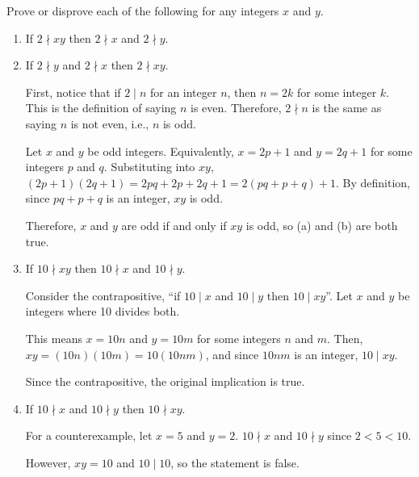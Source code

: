 \begin{recommended}
  Prove or disprove each of the following for any integers $x$ and $y$.
\end{recommended}
\begin{enumerate}
  \item If $2 \nmid xy$ then $2 \nmid x$ and $2 \nmid y$.
  \item If $2 \nmid y$ and $2 \nmid x$ then $2 \nmid xy$.
        \begin{prf}
          First, notice that if $2 \mid n$ for an integer $n$, then $n = 2k$ for some integer $k$.
          This is the definition of saying $n$ is even.
          Therefore, $2 \nmid n$ is the same as saying $n$ is not even, i.e., $n$ is odd.

          Let $x$ and $y$ be odd integers.
          Equivalently, $x = 2p + 1$ and $y = 2q + 1$ for some integers $p$ and $q$.
          Substituting into $xy$, $(2p + 1)(2q + 1) = 2pq + 2p + 2q + 1 = 2(pq + p + q) + 1$.
          By definition, since $pq + p + q$ is an integer, $xy$ is odd.

          Therefore, $x$ and $y$ are odd if and only if $xy$ is odd, so (a) and (b) are both true.
        \end{prf}
  \item If $10 \nmid xy$ then $10 \nmid x$ and $10 \nmid y$.
        \begin{prf}
          Consider the contrapositive, ``if $10 \mid x$ and $10 \mid y$ then $10 \mid xy$''.
          Let $x$ and $y$ be integers where 10 divides both.

          This means $x = 10n$ and $y = 10m$ for some integers $n$ and $m$.
          Then, $xy = (10n)(10m) = 10(10nm)$, and since $10nm$ is an integer, $10 \mid xy$.

          Since the contrapositive, the original implication is true.
        \end{prf}
  \item If $10 \nmid x$ and $10 \nmid y$ then $10 \nmid xy$.
        \begin{prf}
          For a counterexample, let $x = 5$ and $y = 2$.
          $10 \nmid x$ and $10 \nmid y$ since $2 < 5 < 10$.

          However, $xy = 10$ and $10 \mid 10$, so the statement is false.
        \end{prf}
\end{enumerate}


